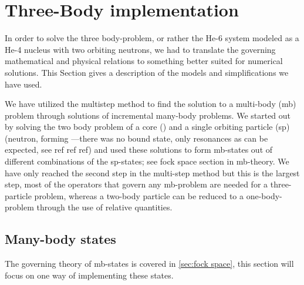 \section{Three-Body implementation}
In order to solve the three body-problem, or rather the He-6 system 
modeled as a He-4 nucleus with two orbiting neutrons, we had to 
translate the governing mathematical and physical relations to 
something better suited for numerical solutions. This Section gives a description of the models and simplifications we have used.

We have utilized the multistep method to find the solution to a 
multi-body (mb) problem through solutions of incremental many-body 
problems. We started out by solving the two body problem of a core 
() and a single orbiting particle (sp) (neutron, forming 
---there was no bound state, only resonances as can be expected, 
see ref ref ref) and used these solutions to form mb-states out of 
different combinations of the sp-states; see fock space section in 
mb-theory. We have only reached the second step in the multi-step 
method but this is the largest step, most of the operators that govern 
any mb-problem are needed for a three-particle problem, whereas a 
two-body particle can be reduced to a one-body-problem through the 
use of relative quantities.
 
\subsection{Many-body states}
The governing theory of mb-states is covered in \cref{sec:fock space}, this section will focus on one way of implementing these states.

